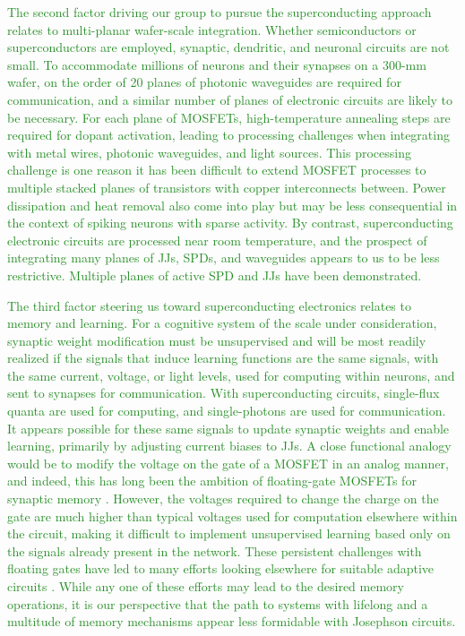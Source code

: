\documentclass{article}
\begin{document}
\begin{multicols}{2}
\textcolor{ForestGreen}{The second factor driving our group to pursue the superconducting approach relates to multi-planar wafer-scale integration. Whether semiconductors or superconductors are employed, synaptic, dendritic, and neuronal circuits are not small. To accommodate millions of neurons and their synapses on a 300-mm wafer, on the order of 20 planes of photonic waveguides are required for communication, and a similar number of planes of electronic circuits are likely to be necessary. For each plane of MOSFETs, high-temperature annealing steps are required for dopant activation, leading to processing challenges when integrating with metal wires, photonic waveguides, and light sources. This processing challenge is one reason it has been difficult to extend MOSFET processes to multiple stacked planes of transistors with copper interconnects between. Power dissipation and heat removal also come into play but may be less consequential in the context of spiking neurons with sparse activity. By contrast, superconducting electronic circuits are processed near room temperature, and the prospect of integrating many planes of JJs, SPDs, and waveguides appears to us to be less restrictive. Multiple planes of active SPD \cite{vema2012} and JJs \cite{} have been demonstrated.}

\textcolor{ForestGreen}{The third factor steering us toward superconducting electronics relates to memory and learning. For a cognitive system of the scale under consideration, synaptic weight modification must be unsupervised and will be most readily realized if the signals that induce learning functions are the same signals, with the same current, voltage, or light levels, used for computing within neurons, and sent to synapses for communication. With superconducting circuits, single-flux quanta are used for computing, and single-photons are used for communication. It appears possible for these same signals to update synaptic weights and enable learning, primarily by adjusting current biases to JJs. A close functional analogy would be to modify the voltage on the gate of a MOSFET in an analog manner, and indeed, this has long been the ambition of floating-gate MOSFETs for synaptic memory \cite{hama2013}. However, the voltages required to change the charge on the gate are much higher than typical voltages used for computation elsewhere within the circuit, making it difficult to implement unsupervised learning based only on the signals already present in the network. These persistent challenges with floating gates have led to many efforts looking elsewhere for suitable adaptive circuits \cite{upji2019}. While any one of these efforts may lead to the desired memory operations, it is our perspective that the path to systems with lifelong and a multitude of memory mechanisms appear less formidable with Josephson circuits.}


\end{multicols}
\end{document}
